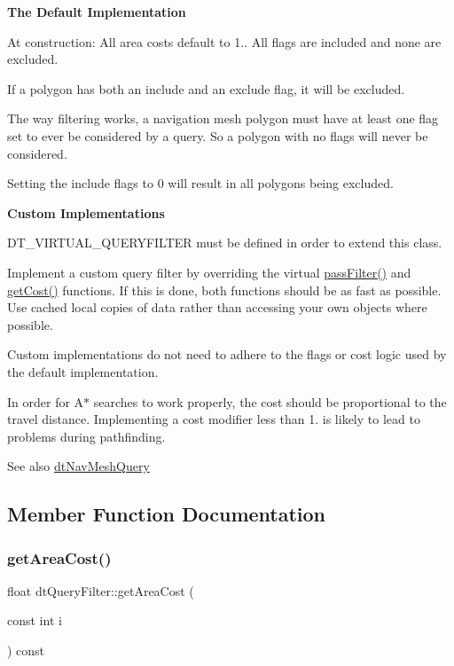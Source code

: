 {\bfseries The Default Implementation}

At construction\+: All area costs default to 1.. All flags are included and none are excluded.

If a polygon has both an include and an exclude flag, it will be excluded.

The way filtering works, a navigation mesh polygon must have at least one flag set to ever be considered by a query. So a polygon with no flags will never be considered.

Setting the include flags to 0 will result in all polygons being excluded.

{\bfseries Custom Implementations}

D\+T\+\_\+\+V\+I\+R\+T\+U\+A\+L\+\_\+\+Q\+U\+E\+R\+Y\+F\+I\+L\+T\+ER must be defined in order to extend this class.

Implement a custom query filter by overriding the virtual \hyperlink{classdtQueryFilter_aaf072b8617dfbd4701a8e07f0f10be9c}{pass\+Filter()} and \hyperlink{classdtQueryFilter_a11d016505b732a1a013c3771a4157dea}{get\+Cost()} functions. If this is done, both functions should be as fast as possible. Use cached local copies of data rather than accessing your own objects where possible.

Custom implementations do not need to adhere to the flags or cost logic used by the default implementation.

In order for A$\ast$ searches to work properly, the cost should be proportional to the travel distance. Implementing a cost modifier less than 1. is likely to lead to problems during pathfinding.

\begin{DoxySeeAlso}{See also}
\hyperlink{classdtNavMeshQuery}{dt\+Nav\+Mesh\+Query} 
\end{DoxySeeAlso}


\subsection{Member Function Documentation}
\mbox{\label{classdtQueryFilter_a1e41582a45d2a10eb7e68740475e5665}} 
\subsubsection{\texorpdfstring{get\+Area\+Cost()}{getAreaCost()}\hspace{0.1cm}{\footnotesize\ttfamily [1/2]}}
{\footnotesize\ttfamily float dt\+Query\+Filter\+::get\+Area\+Cost (\begin{DoxyParamCaption}\item[{const int}]{i }\end{DoxyParamCaption}) const\hspace{0.3cm}{\ttfamily [inline]}}

